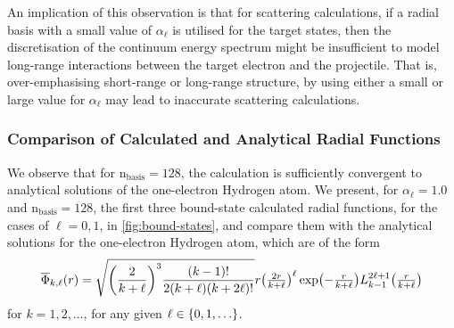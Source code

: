 \documentclass[]{article}
\begin{document}
An implication of this observation is that for scattering calculations, if a
radial basis with a small value of $\alpha_{\ell}$ is utilised for the target
states, then the discretisation of the continuum energy spectrum might be
insufficient to model long-range interactions between the target electron and
the projectile.
That is, over-emphasising short-range or long-range structure, by using either a
small or large value for $\alpha_{\ell}$ may lead to inaccurate scattering
calculations.

\subsubsection{Comparison of Calculated and Analytical Radial Functions}

We observe that for $\mathrm{n_{basis}} = 128$, the calculation is sufficiently
convergent to analytical solutions of the one-electron Hydrogen atom.
We present, for $\alpha_{\ell} = 1.0$ and $\mathrm{n_{basis}} = 128$, the first
three bound-state calculated radial functions, for the cases of $\ell = 0, 1$,
in \autoref{fig:bound-states}, and compare them with the analytical solutions
for the one-electron Hydrogen atom, which are of the form
\begin{equation*}
  \overline{\Phi}_{k, \ell}\lr{r}
  =
  \sqrt
  {
    \lr[\bigg]
    {
      \dfrac
      {
        2
      }
      {
        k
        +
        \ell
      }
    }^{3}
    \dfrac
    {
      \lr{k - 1}!
    }
    {
      2
      \lr{k + \ell}
      \lr{k + 2\ell}!
    }
  }
  r
  \lr[\big]
  {
    \tfrac
    {
      2
      r
    }
    {
      k
      +
      \ell
    }
  }^{\ell}
  \exponential\lr[\big]
  {
    -
    \tfrac
    {
      r
    }
    {
      k
      +
      \ell
    }
  }
  L_{k - 1}^{2\ell + 1}\lr[\big]
  {
    \tfrac
    {
      r
    }
    {
      k
      +
      \ell
    }
  }
\end{equation*}
for $k = 1, 2, \dotsc$, for any given $\ell \in \lrset{0, 1, \dotsc}$.
\end{document}
